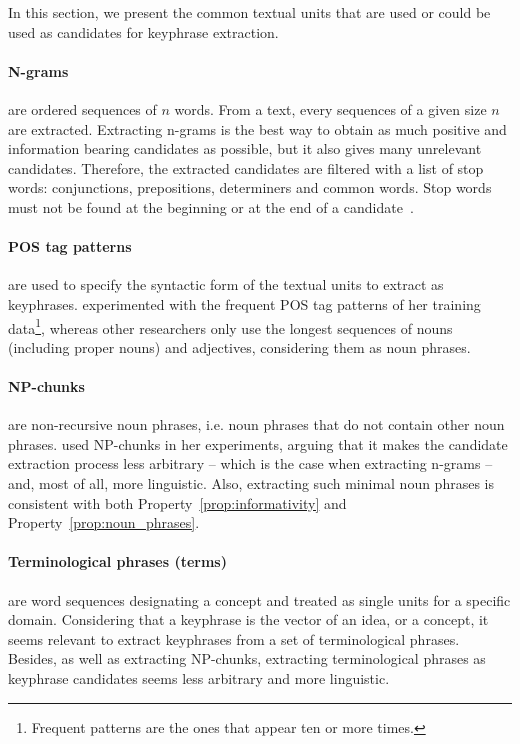   In this section, we present the common textual units that are used or could be
  used as candidates for keyphrase extraction.

  \paragraph{N-grams} are ordered sequences of $n$ words. From a text, every
  sequences of a given size $n$ are extracted. Extracting n-grams is the best
  way to obtain as much positive and information bearing candidates as possible,
  but it also gives many unrelevant candidates. Therefore, the extracted
  candidates are filtered with a list of stop words: conjunctions, prepositions,
  determiners  and common words. Stop words must not be found at the beginning
  or at the end of a
  candidate~\cite{witten1999kea,hulth2003keywordextraction}.

  \paragraph{POS tag patterns} are used to specify the syntactic form of the
  textual units to extract as keyphrases. 
  experimented with the frequent POS tag patterns of her training
  data\footnote{Frequent patterns are the ones that appear ten or more times.},
  whereas other researchers only use the longest sequences of nouns (including
  proper nouns) and adjectives, considering them as noun phrases.

  \paragraph{NP-chunks} are non-recursive noun phrases, i.e. noun phrases that
  do not contain other noun phrases.  used
  NP-chunks in her experiments, arguing that it makes the candidate extraction
  process less arbitrary -- which is the case when extracting n-grams -- and,
  most of all, more linguistic. Also, extracting such minimal noun phrases is
  consistent with both Property~\ref{prop:informativity} and
  Property~\ref{prop:noun_phrases}.

  \paragraph{Terminological phrases (terms)} are word sequences designating a
  concept and treated as single units for a specific domain. Considering that a
  keyphrase is the vector of an idea, or a concept, it seems relevant to extract
  keyphrases from  a set of terminological phrases. Besides, as well as
  extracting NP-chunks, extracting terminological phrases as keyphrase
  candidates seems less arbitrary and more linguistic.

